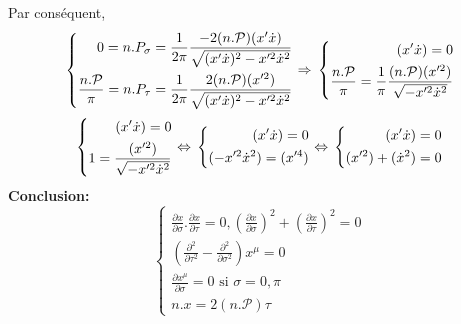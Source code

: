 \documentclass[a4paper,12pt]{article}
\def\xmu{x^\mu}
\begin{document}
Par conséquent, 
\begin{equation*}
	\left\lbrace
	\begin{aligned}
	0=n.P_\sigma=\frac{1}{2\pi}\frac{-2(n.\mathcal{P})(x'\dot{x})}{\sqrt{(x'\dot{x})^2-x'^2\dot{x}^2}}\\
	\frac{n.\mathcal{P}}{\pi}=n.P_\tau=\frac{1}{2\pi}\frac{2(n.\mathcal{P}) (x'^2)}{\sqrt{(x'\dot{x})^2-x'^2\dot{x}^2}}
	\end{aligned}
	\right.
	\Rightarrow\\
	\left\lbrace
	\begin{aligned}
	(x'\dot{x})=0\\
	\frac{n.\mathcal{P}}{\pi}=\frac{1}{\pi}\frac{(n.\mathcal{P}) (x'^2)}{\sqrt{-x'^2\dot{x}^2}}
	\end{aligned}
	\right.	
\end{equation*}
\begin{equation*}
	\left\lbrace
	\begin{aligned}
	(x'\dot{x})=0\\
	1=\frac{ (x'^2)}{\sqrt{-x'^2\dot{x}^2}}
	\end{aligned}
	\right.
	\Leftrightarrow\\
	\left\lbrace
	\begin{aligned}
	(x'\dot{x})=0\\
	(-x'^2\dot{x}^2)=(x'^4)
	\end{aligned}
	\right.	
	\Leftrightarrow\\
	\left\lbrace
	\begin{aligned}
	(x'\dot{x})=0\\
	(x'^2)+(\dot{x}^2)=0
	\end{aligned}
	\right.	
\end{equation*}
\textbf{Conclusion:}
\begin{equation}
	\left\lbrace
	\begin{aligned}
		\frac{\partial x}{\partial \sigma}.\frac{\partial x}{\partial \tau}=0, \left( \frac{\partial x}{\partial \sigma}\right) ^2+\left( \frac{\partial x}{\partial \tau}\right) ^2=0\\ 
    	\left( \frac{\partial^2}{\partial  \tau^2}-\frac{\partial^2}{\partial  \sigma^2}\right) \xmu=0\\ 
    	\frac{\partial \xmu}{\partial \sigma}=0 \mbox{  si $\sigma=0,\pi$}\\ 
    	n.x=2(n.\mathcal{P})\tau 
	\end{aligned}
    \right.
\end{equation}
\end{document}
